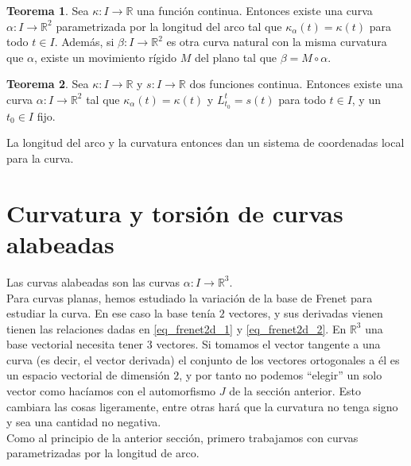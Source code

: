 \documentclass{article}
\theoremstyle{definition}
\newtheorem{theorem}{Teorema}
\newcommand{\reales}{\mathbb{R}}
\begin{document}
\begin{theorem}
	Sea $\kappa : I \rightarrow \reales$ una función continua. Entonces existe una curva $\alpha : I \rightarrow \reales^2$ parametrizada por la longitud del arco tal que $\kappa_{\alpha}(t) = \kappa(t)$ para todo $t \in I$. Además, si $\beta : I \rightarrow \reales^2$ es otra curva natural con la misma curvatura que $\alpha$, existe un movimiento rígido $M$ del plano tal que $\beta = M \circ \alpha$.
\end{theorem}	
	
\begin{theorem}
	Sea $\kappa : I \rightarrow \reales$ y $s : I \rightarrow \reales$ dos funciones continua. Entonces existe una curva $\alpha : I \rightarrow \reales^2$ tal que $\kappa_{\alpha}(t) = \kappa(t)$ y $L_{t_0}^{t} = s(t)$ para todo $t \in I$, y un $t_0 \in I$ fijo.
\end{theorem}

La longitud del arco y la curvatura entonces dan un sistema de coordenadas local para la curva.









\section{Curvatura y torsión de curvas alabeadas}
Las curvas alabeadas son las curvas $\alpha : I \rightarrow \reales^3$. \\ 
Para curvas planas, hemos estudiado la variación de la base de Frenet para estudiar la curva. En ese caso la base tenía $2$ vectores, y sus derivadas vienen tienen las relaciones dadas en \eqref{eq_frenet2d_1} y \eqref{eq_frenet2d_2}. En $\reales^3$ una base vectorial necesita tener $3$ vectores. Si tomamos el vector tangente a una curva (es decir, el vector derivada) el conjunto de los vectores ortogonales a él es un espacio vectorial de dimensión $2$, y por tanto no podemos ``elegir'' un solo vector como hacíamos con el automorfismo $J$ de la sección anterior. Esto cambiara las cosas ligeramente, entre otras hará que la curvatura no tenga signo y sea una cantidad no negativa. \\
Como al principio de la anterior sección, primero trabajamos con curvas parametrizadas por la longitud de arco.
\end{document}
